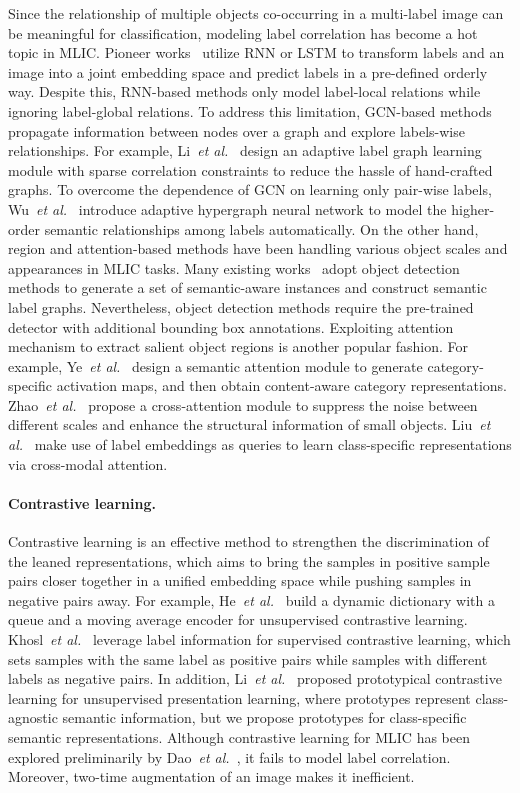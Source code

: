 \documentclass{ecai}
\def\etal{{\em et al.}}
\begin{document}
Since the relationship of multiple objects co-occurring in a multi-label image can be meaningful for classification, modeling label correlation has become a hot topic in MLIC.	
Pioneer works~\cite{wang2016cnn,Wang2017ICCV} utilize RNN or LSTM to transform labels and an image into a joint embedding space and predict labels in a pre-defined orderly way.
Despite this, RNN-based methods only model label-local relations while ignoring label-global relations.
To address this limitation, GCN-based methods propagate information between nodes over a graph and explore labels-wise relationships.
For example, Li~\etal~\cite{li2020learning} design an adaptive label graph learning module with sparse correlation constraints to reduce the hassle of hand-crafted graphs.
To overcome the dependence of GCN on learning only pair-wise labels, Wu~\etal~\cite{wu2020adahgnn} introduce adaptive hypergraph neural network to model the higher-order semantic relationships among labels automatically.
On the other hand, region and attention-based methods have been handling various object scales and appearances in MLIC tasks.
Many existing works~\cite{wu2021gm} adopt object detection methods to generate a set of semantic-aware instances and construct semantic label graphs.
Nevertheless, object detection methods require the pre-trained detector with additional bounding box annotations.
Exploiting attention mechanism to extract salient object regions is another popular fashion.
For example, Ye~\etal~\cite{ye2020attention} design a semantic attention module to generate category-specific activation maps, and then obtain content-aware category representations.
Zhao~\etal~\cite{Zhao2021ICCV} propose a cross-attention module to suppress the noise between different scales and enhance the structural information of small objects.
Liu~\etal~\cite{liu2021q2l} make use of label embeddings as queries to learn class-specific representations via cross-modal attention.

\paragraph{Contrastive learning.} Contrastive learning is an effective method to strengthen the discrimination of the leaned representations, which aims to bring the samples in positive sample pairs closer together in a unified embedding space while pushing samples in negative pairs away.
For example, He~\etal~\cite{he2020momentum} build a dynamic dictionary with a queue and a moving average encoder for unsupervised contrastive learning. 
Khosl~\etal~\cite{khosla2020supervised} leverage label information for supervised contrastive learning, which sets samples with the same label as positive pairs while samples with different labels as negative pairs.
In addition, Li~\etal~\cite{li2021prototypical} proposed prototypical contrastive learning for unsupervised presentation learning, where prototypes represent class-agnostic semantic information, but we propose prototypes for class-specific semantic representations.
Although contrastive learning for MLIC has been explored preliminarily by Dao~\etal~\cite{dao2021multi}, it fails to model label correlation. Moreover, two-time augmentation of an image makes it inefficient.
\end{document}
